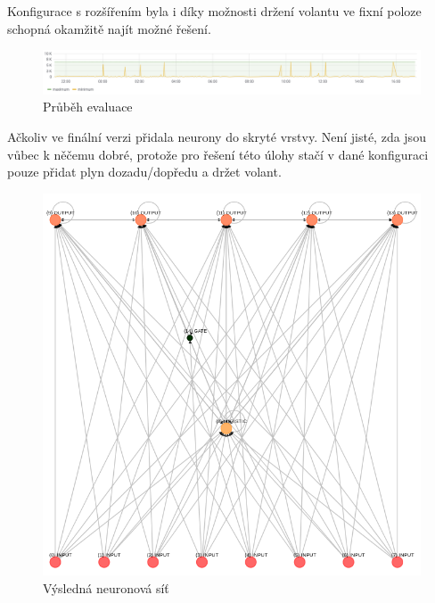 Konfigurace s rozšířením byla i díky možnosti držení volantu ve fixní poloze schopná okamžitě najít možné řešení.
\begin{figure}[H]
	\centering
	\includegraphics[width=1.0\linewidth]{solutions/Ibasic/advancedGraph}
	\caption{Průběh evaluace}
	\label{fig:IbasicAdvancedGraph}
\end{figure}
Ačkoliv ve finální verzi přidala neurony do skryté vrstvy. Není jisté, zda jsou vůbec k něčemu dobré, protože pro řešení této úlohy stačí v dané konfiguraci pouze přidat plyn dozadu/dopředu a držet volant.
\begin{figure}[H]
	\centering
	\includegraphics[width=0.6\linewidth]{solutions/Ibasic/advanced}
	\caption{Výsledná neuronová síť}
	\label{fig:basicAdvanced}
\end{figure}

